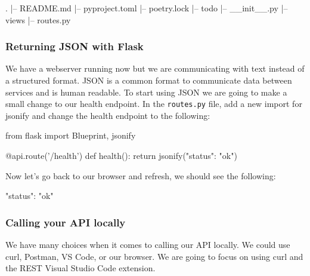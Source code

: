 \documentclass{csse4400}
\begin{document}
\noindent\begin{minipage}{\textwidth}
\begin{code}[language=bash,numbers=none]{}
  .
  |-- README.md
  |-- pyproject.toml
  |-- poetry.lock
  |-- todo
      |-- __init__.py
      |-- views
          |-- routes.py
\end{code}
\end{minipage}

\subsubsection{Returning JSON with Flask}

We have a webserver running now but we are communicating with text instead of a structured format. JSON is a common format to communicate data between services and is human readable. To start using JSON we are going to make a small change to our health endpoint. In the \texttt{routes.py} file, add a new import for jsonify and change the health endpoint to the following:

\begin{code}[language=python]{}
  from flask import Blueprint, jsonify
\end{code}

\begin{code}[language=python,firstnumber=6]{}
  @api.route('/health')
  def health():
      return jsonify({"status": "ok"})
\end{code}

Now let's go back to our browser and refresh, we should see the following:

\begin{code}[language=json,numbers=none]{}
  {
    "status": "ok"
  }
\end{code}


\subsubsection{Calling your API locally}

We have many choices when it comes to calling our API locally.
We could use curl, Postman, VS Code, or our browser.
We are going to focus on using curl and the REST Visual Studio Code extension.

\end{document}
